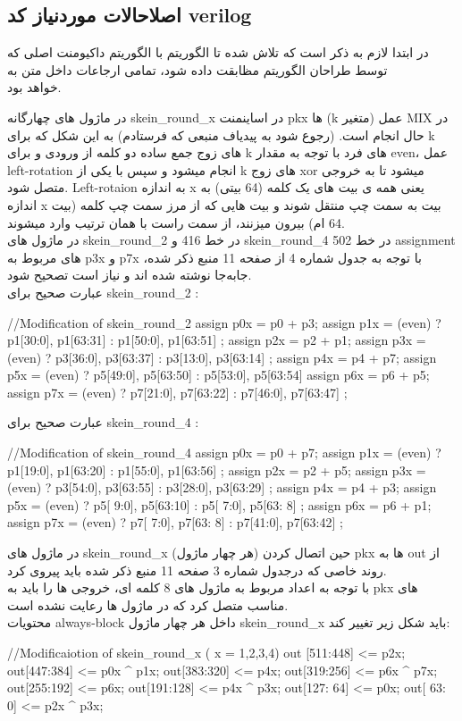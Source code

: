 \subsection{اصلاحالات موردنیاز کد verilog}
در ابتدا لازم به ذکر است که تلاش شده تا الگوریتم با الگوریتم داکیومنت اصلی که توسط طراحان الگوریتم مظابقت داده شود، تمامی ارجاعات داخل متن به \\
	خواهد بود. 
\par
در ماژول های چهارگانه skein\_round\_x در اساینمنت pkx ها (k متغیر) عمل MIX در حال انجام است. (رجوع شود به پیدیاف منبعی که فرستادم) 
به این شکل که برای k های زوج جمع ساده دو کلمه از ورودی و برای k های فرد با توجه به مقدار even، عمل left-rotation انجام میشود و سپس با یکی از k های زوج xor میشود تا به خروجی متصل شود.
Left-rotaion به اندازه x یعنی همه ی بیت های یک کلمه (64 بیتی) به اندازه x بیت به سمت چپ منتقل شوند و بیت هایی که از مرز سمت چپ کلمه (بیت 64 ام) بیرون میزنند، از سمت راست با همان ترتیب وارد میشوند.\\
 در ماژول های skein\_round\_2 در خط 416 و skein\_round\_4 در خط 502 assignment های مربوط به p3x و p7x با توجه به جدول شماره 4 از صفحه 11 منبع ذکر شده، جابه‌جا نوشته شده اند و نیاز است تصحیح شود.\\
 عبارت صحیح برای skein\_round\_2 :
 \begin{code}
 	//Modification of skein_round_2
 	assign p0x = p0 + p3;
	assign p1x = (even) ? { p1[30:0], p1[63:31] } : { p1[50:0], p1[63:51] };
	assign p2x = p2 + p1;
	assign p3x = (even) ? { p3[36:0], p3[63:37] } : { p3[13:0], p3[63:14] };
	assign p4x = p4 + p7;
	assign p5x = (even) ? { p5[49:0], p5[63:50] } : { p5[53:0], p5[63:54] }
	assign p6x = p6 + p5;
	assign p7x = (even) ? { p7[21:0], p7[63:22] } : { p7[46:0], p7[63:47] };
 \end{code}
  عبارت صحیح برای skein\_round\_4 :
\begin{code}
	//Modification of skein_round_4
	assign p0x = p0 + p7;
	assign p1x = (even) ? { p1[19:0], p1[63:20] } : { p1[55:0], p1[63:56] };
	assign p2x = p2 + p5;
	assign p3x = (even) ? { p3[54:0], p3[63:55] } : { p3[28:0], p3[63:29] };
	assign p4x = p4 + p3;
	assign p5x = (even) ? { p5[ 9:0], p5[63:10] } : { p5[ 7:0], p5[63: 8] };
	assign p6x = p6 + p1;
	assign p7x = (even) ? { p7[ 7:0], p7[63: 8] } : { p7[41:0], p7[63:42] };
\end{code}
در ماژول های skein\_round\_x (هر چهار ماژول) حین اتصال کردن pkx ها به out از روند خاصی که درجدول شماره 3 صفحه 11 منبع ذکر شده باید پیروی کرد.\\
با توجه به اعداد مربوط به ماژول های 8 کلمه ای، خروجی ها را باید به pkx های مناسب متصل کرد که در ماژول ها رعایت نشده است.\\
محتویات always-block داخل هر چهار ماژول skein\_round\_x باید شکل زیر تغییر کند:
\begin{code}
	//Modificaiotion of skein_round_x ( x = 1,2,3,4)	
	out [511:448] <= p2x;
	out[447:384] <= p0x ^ p1x;
	out[383:320] <= p4x;
	out[319:256] <= p6x ^ p7x;
	out[255:192] <= p6x;
	out[191:128] <= p4x ^ p3x;
	out[127: 64] <= p0x;
	out[ 63:  0] <= p2x ^ p3x;
\end{code}
